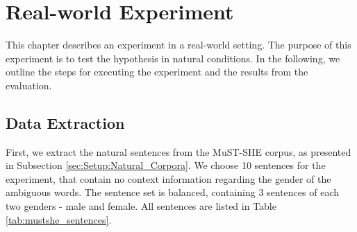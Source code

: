 \chapter{Real-world Experiment}
\label{ch:Real_Experiment} 

This chapter describes an experiment in a real-world setting. The purpose of this experiment is to test the hypothesis in natural conditions. In the following, we outline the steps for executing the
experiment and the results from the evaluation.

\section{Data Extraction}
\label{sec:Real_Experiment:Extraction}

First, we extract the natural sentences from the MuST-SHE corpus, as presented in Subsection \ref{sec:Setup:Natural_Corpora}. We choose 10 sentences for the experiment, that contain no context information regarding the gender of the ambiguous words. The sentence set is balanced, containing 3 sentences of each two genders - male and female. All sentences are listed in Table \ref{tab:mustshe_sentences}.

